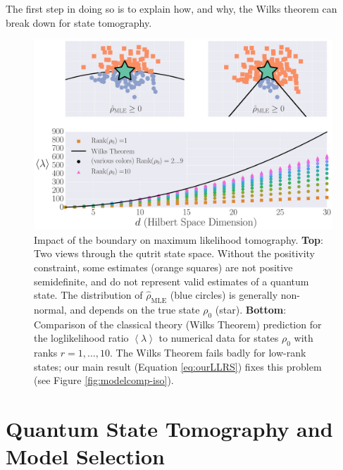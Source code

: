 \documentclass[aps,pra, twocolumn]{revtex4-1}
\newcommand{\expect}[1]{\ensuremath{\left\langle#1\right\rangle}}
\newcommand{\rhohat}{\hat{\rho}}
\newcommand{\rhoMLE}{\rhohat_{\scriptscriptstyle\mathrm{MLE}}}
\begin{document}
The first step in doing so is to explain how, and why, the Wilks theorem can break down for state tomography.

\begin{figure}[h]
\includegraphics[width=\columnwidth]{Images/Figure_1.pdf}
 \caption{Impact of the boundary on maximum likelihood tomography. \textbf{Top}: Two views through the qutrit state space. Without the positivity constraint, some estimates (orange squares) are not positive semidefinite, and do not represent valid estimates of a quantum state. The distribution of $\rhoMLE$ (blue circles) is generally non-normal, and depends on the true state $\rho_{0}$ (star).
\textbf{Bottom}:  Comparison of the classical theory (Wilks Theorem) prediction for the loglikelihood ratio $\expect{\lambda}$ to numerical data for states $\rho_{0}$ with ranks $r=1,\ldots ,10$.  The Wilks Theorem fails badly for low-rank states; our main result (Equation \ref{eq:ourLLRS}) fixes this problem (see Figure \ref{fig:modelcomp-iso}).}
\label{fig:boundaries}
\end{figure}

\section{Quantum State Tomography and Model Selection}
\end{document}
